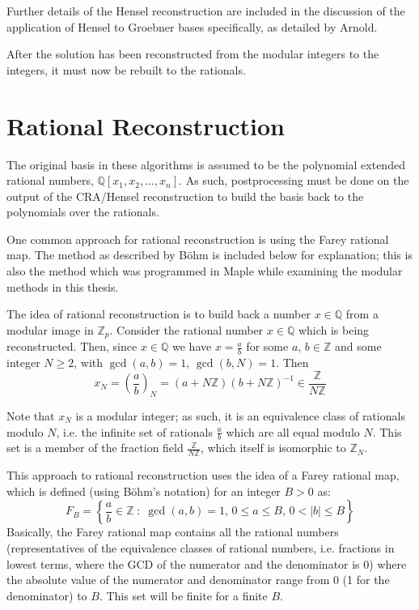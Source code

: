 \documentclass[letterpaper,12pt,titlepage,oneside,final]{book}
\begin{document}
Further details of the Hensel reconstruction are included in the discussion of the application of Hensel to Groebner bases specifically, as detailed by Arnold.

After the solution has been reconstructed from the modular integers to the integers, it must now be rebuilt to the rationals.

\section{Rational Reconstruction}

The original basis in these algorithms is assumed to be the polynomial extended rational numbers, ${\mathbb{Q}[x_1, x_2, \ldots, x_n]}$.  As such, postprocessing must be done on the output of the CRA/Hensel reconstruction to build the basis back to the polynomials over the rationals.  

One common approach for rational reconstruction is using the Farey rational map.  The method as described by B\"ohm is included below for explanation; this is also the method which was programmed in Maple while examining the modular methods in this thesis.

The idea of rational reconstruction is to build back a number ${x \in \mathbb{Q}}$ from a modular image in ${\mathbb{Z}_p}$.  Consider the rational number ${x \in \mathbb{Q}}$ which is being reconstructed.  Then, since ${x \in \mathbb{Q}}$ we have ${x = \frac{a}{b}}$ for some ${a,\,b \in \mathbb{Z}}$ and some integer ${N \geq 2}$, with ${\gcd(a, b) = 1,\, \gcd(b, N) = 1}$.
Then
\begin{equation*}
  x_N = \left(\frac{a}{b}\right)_N = (a + N\mathbb{Z})(b + N\mathbb{Z})^{-1} \in \frac{\mathbb{Z}}{N\mathbb{Z}}
\end{equation*}   

Note that ${x_N}$ is a modular integer; as such, it is an equivalence class of rationals modulo ${N}$, i.e. the infinite set of rationals ${\frac{a}{b}}$ which are all equal modulo ${N}$.  This set is a member of the fraction field ${\frac{\mathbb{Z}}{N\mathbb{Z}}}$, which itself is isomorphic to ${\mathbb{Z}_N}$.

This approach to rational reconstruction uses the idea of a Farey rational map, which is defined (using B\"ohm's notation) for an integer ${B > 0}$ as:
\begin{equation*}
  F_B = \left\{\frac{a}{b} \in \mathbb{Z}\; : \; \gcd(a, b) = 1,\, 0 \leq a \leq B,\, 0 < |b| \leq B\right\}
\end{equation*}
Basically, the Farey rational map contains all the rational numbers (representatives of the equivalence classes of rational numbers, i.e. fractions in lowest terms, where the GCD of the numerator and the denominator is 0) where the absolute value of the numerator and denominator range from 0 (1 for the denominator) to ${B}$.  This set will be finite for a finite ${B}$.
\end{document}
